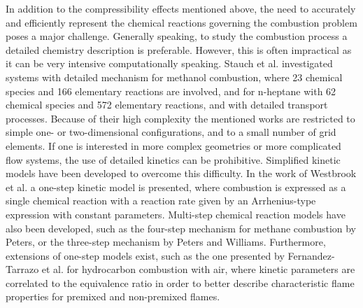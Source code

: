 In addition to the compressibility effects mentioned above, the need to accurately and efficiently represent the chemical reactions governing the combustion problem poses a major challenge. Generally speaking, to study the combustion process a detailed chemistry description is preferable. However, this is often impractical as it can be very intensive computationally speaking. Stauch et al. investigated systems with detailed mechanism for methanol combustion, where 23 chemical species and 166 elementary reactions are involved, \textcite{stauchDetailedNumericalSimulation2006} and for n-heptane with 62 chemical species and 572 elementary reactions, and with detailed transport processes\textcite{stauchAutoignitionSingleNheptane2007}. Because of their high complexity the mentioned works are restricted to simple one- or two-dimensional configurations, and to a small number of grid elements. If one is interested in more complex geometries or more complicated flow systems, the use of detailed kinetics can be prohibitive. Simplified kinetic models have been developed to overcome this difficulty. In the work of Westbrook et al. \textcite{westbrookSimplifiedReactionMechanisms1981} a one-step kinetic model is presented, where combustion is expressed as a single chemical reaction with a reaction rate given by an Arrhenius-type expression with constant parameters. Multi-step chemical reaction models have also been developed, such as the four-step mechanism for methane combustion by Peters, \textcite{petersNumericalAsymptoticAnalysis1985} or the three-step mechanism by Peters and Williams. \textcite{petersAsymptoticStructureStoichiometric1987}
Furthermore, extensions of one-step models exist, such as the one presented by Fernandez-Tarrazo et al. \textcite{fernandez-tarrazoSimpleOnestepChemistry2006} for hydrocarbon combustion with air, where kinetic parameters are correlated to the equivalence ratio in order to better describe characteristic flame properties for premixed and non-premixed flames.

